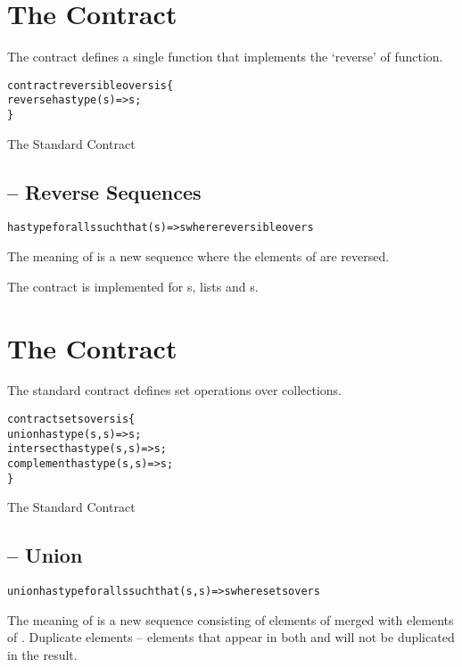 \section{The  Contract}
\label{reversibleContract}
The  contract defines a single function that implements the `reverse' of function.

\begin{program}[H]
\begin{alltt}
contract reversible over s is \{
  reverse has type (s)=>s;
\}
\end{alltt}
\caption{The Standard  Contract}\label{reversibleContractDef}
\end{program}
\noindent

\subsection{ -- Reverse Sequences}
\label{reverseFunction}
\begin{alltt}
 has type for all s such that (s)=>s where reversible over s
\end{alltt}
The meaning of  is a new sequence where the elements of  are reversed.

\begin{aside}
The  contract is implemented for s,  lists and s.
\end{aside}
\section{The  Contract}
\label{setsContract}
The standard  contract defines set operations over collections. 

\begin{program}[hbtp]
\begin{alltt}
contract sets over s is \{
  union has type (s,s)=>s;
  intersect has type (s,s)=>s;
  complement has type (s,s)=>s;
\}
\end{alltt}
\caption{The Standard  Contract}\label{setContractDef}
\end{program}
\noindent

\subsection{ -- Union}
\label{unionFunction}
\begin{alltt}
union has type for all s such that (s,s)=>s where sets over s
\end{alltt}
The meaning of  is a new sequence consisting of elements of  merged with elements of . Duplicate elements -- elements that appear in both  and  will not be duplicated in the result.

